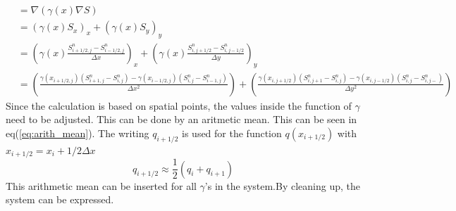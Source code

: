 \documentclass[%
twoside,                 %
final,                   %
10pt]{article}
\begin{document}
\begin{equation} \label{eq:gamma}
    \begin{aligned}
    &=\nabla(\gamma(x) \nabla S) \\
    &=(\gamma(x) S_x)_x+(\gamma(x) S_y)_y \\
    &= \left(\gamma(x) \frac{S^{n}_{i+1/2,j}-S^{n}_{i-1/2,j}}{\Delta x}\right)_x+\left(\gamma(x) \frac{S^{n}_{i,j+1/2}-S^{n}_{i,j-1/2}}{\Delta y}\right)_y \\
    &= \left(\frac{\gamma(x_{i+1/2,j})(S^{n}_{i+1,j}-S^{n}_{i,j})-\gamma(x_{i-1/2,j})(S^{n}_{i,j}-S^{n}_{i-1,j})}{\Delta x^2}\right)+\left(\frac{\gamma(x_{i,j+1/2})(S^{n}_{i,j+1}-S^{n}_{i,j})-\gamma(x_{i,j-1/2})(S^{n}_{i,j}-S^{n}_{i,j-})}{\Delta y^2}\right)
    \end{aligned}
\end{equation}
Since the calculation is based on spatial points, the values inside the function of $\gamma$ need to be adjusted. This can be done by an aritmetic mean. This can be seen in eq(\ref{eq:arith_mean}). The writing $q_{i+1/2}$ is used for the function $q(x_{i+1/2})$ with $x_{i+1/2} = x_i + 1/2 \Delta x$
\begin{equation} \label{eq:arith_mean}
q_{i+1/2} \approx \frac{1}{2}(q_i +q_{i+1})
\end{equation}
This arithmetic mean can be inserted for all $\gamma$'s in the system.By cleaning up, the system can be expressed.
\end{document}
